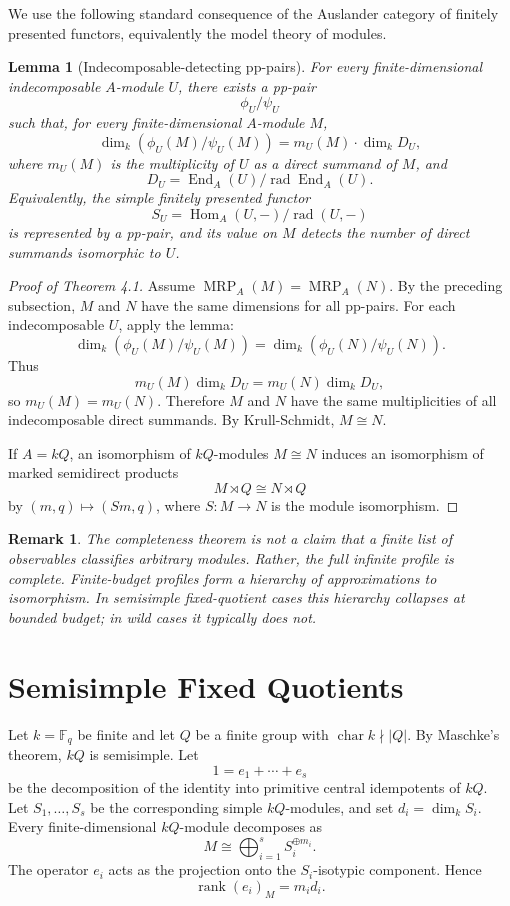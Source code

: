 \documentclass[11pt]{article}
\newtheorem{lemma}[theorem]{Lemma}
\newtheorem{remark}[theorem]{Remark}
\begin{document}
We use the following standard consequence of the Auslander category of finitely presented functors, equivalently the model theory of modules.

\begin{lemma}[Indecomposable-detecting pp-pairs]
For every finite-dimensional indecomposable $A$-module $U$, there exists a pp-pair
\[
\phi_U/\psi_U
\]
such that, for every finite-dimensional $A$-module $M$,
\[
\dim_k(\phi_U(M)/\psi_U(M))
=
m_U(M)\cdot \dim_k D_U,
\]
where $m_U(M)$ is the multiplicity of $U$ as a direct summand of $M$, and
\[
D_U=\operatorname{End}_A(U)/\operatorname{rad}\operatorname{End}_A(U).
\]
Equivalently, the simple finitely presented functor
\[
S_U=\operatorname{Hom}_A(U,-)/\operatorname{rad}(U,-)
\]
is represented by a pp-pair, and its value on $M$ detects the number of direct summands isomorphic to $U$.
\end{lemma}

\begin{proof}[Proof of Theorem 4.1]
Assume $\operatorname{MRP}_A(M)=\operatorname{MRP}_A(N)$. By the preceding subsection, $M$ and $N$ have the same dimensions for all pp-pairs. For each indecomposable $U$, apply the lemma:
\[
\dim_k(\phi_U(M)/\psi_U(M))
=
\dim_k(\phi_U(N)/\psi_U(N)).
\]
Thus
\[
m_U(M)\dim_kD_U=m_U(N)\dim_kD_U,
\]
so $m_U(M)=m_U(N)$. Therefore $M$ and $N$ have the same multiplicities of all indecomposable direct summands. By Krull-Schmidt, $M\cong N$.

If $A=kQ$, an isomorphism of $kQ$-modules $M\cong N$ induces an isomorphism of marked semidirect products
\[
M\rtimes Q\cong N\rtimes Q
\]
by $(m,q)\mapsto (Sm,q)$, where $S:M\to N$ is the module isomorphism.
\end{proof}

\begin{remark}
The completeness theorem is not a claim that a finite list of observables classifies arbitrary modules. Rather, the full infinite profile is complete. Finite-budget profiles form a hierarchy of approximations to isomorphism. In semisimple fixed-quotient cases this hierarchy collapses at bounded budget; in wild cases it typically does not.
\end{remark}

\section{Semisimple Fixed Quotients}

Let $k=\mathbb F_q$ be finite and let $Q$ be a finite group with $\operatorname{char}k\nmid |Q|$. By Maschke's theorem, $kQ$ is semisimple. Let
\[
1=e_1+\cdots+e_s
\]
be the decomposition of the identity into primitive central idempotents of $kQ$. Let $S_1,\ldots,S_s$ be the corresponding simple $kQ$-modules, and set $d_i=\dim_k S_i$. Every finite-dimensional $kQ$-module decomposes as
\[
M\cong \bigoplus_{i=1}^s S_i^{\oplus m_i}.
\]
The operator $e_i$ acts as the projection onto the $S_i$-isotypic component. Hence
\[
\operatorname{rank}(e_i)_M=m_i d_i.
\]
\end{document}
